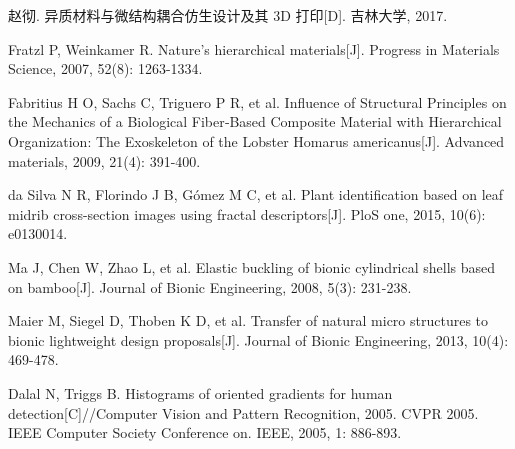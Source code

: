\begin{thebibliography}{plain}
赵彻. 异质材料与微结构耦合仿生设计及其 3D 打印[D]. 吉林大学, 2017.

Fratzl P, Weinkamer R. Nature’s hierarchical materials[J]. Progress in Materials Science, 2007, 52(8): 1263-1334.

Fabritius H O, Sachs C, Triguero P R, et al. Influence of Structural Principles on the Mechanics of a Biological Fiber‐Based Composite Material with Hierarchical Organization: The Exoskeleton of the Lobster Homarus americanus[J]. Advanced materials, 2009, 21(4): 391-400.

da Silva N R, Florindo J B, Gómez M C, et al. Plant identification based on leaf midrib cross-section images using fractal descriptors[J]. PloS one, 2015, 10(6): e0130014.

Ma J, Chen W, Zhao L, et al. Elastic buckling of bionic cylindrical shells based on bamboo[J]. Journal of Bionic Engineering, 2008, 5(3): 231-238.

Maier M, Siegel D, Thoben K D, et al. Transfer of natural micro structures to bionic lightweight design proposals[J]. Journal of Bionic Engineering, 2013, 10(4): 469-478.

Dalal N, Triggs B. Histograms of oriented gradients for human detection[C]//Computer Vision and Pattern Recognition, 2005. CVPR 2005. IEEE Computer Society Conference on. IEEE, 2005, 1: 886-893.

\end{thebibliography}
